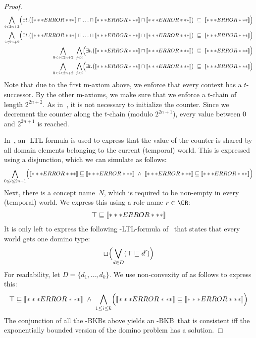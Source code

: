 \begin{proof}
  \begin{align*}
    \bigwedge_{i<2n+2} \Bigl( \exists t.\bigl(\oax{Z_{0}(a)} \sqcap\ldots\sqcap \oax{Z_{i-1}(a)} \sqcap \oax{Z_{i}(a)}\bigr)
    & \ \sqsubseteq\ \oax{(\lnot Z_{i})(a)}\Bigr)\\ 
    \bigwedge_{i<2n+2}\Bigl( \exists t.\bigl(\oax{Z_{0}(a)}\sqcap\ldots\sqcap \oax{Z_{i-1}(a)} \sqcap \oax{(\lnot Z_{i})(a)}\bigr)
    & \ \sqsubseteq\ \oax{Z_{i}(a)}\Bigr)\\
    \bigwedge_{0<i<2n+2}\ \bigwedge_{j<i}\Bigl(\exists t.\bigl(\oax{(\lnot Z_{j})(a)}\sqcap\oax{Z_{i}(a)}\bigr)
    & \ \sqsubseteq\ \oax{Z_{i}(a)}\Bigr)\\
    \bigwedge_{0<i<2n+2}\ \bigwedge_{j<i}\Bigl(\exists t.\bigl(\oax{(\lnot Z_{j})(a)}\sqcap\oax{(\lnot Z_{i})(a)}\bigr)
    & \ \sqsubseteq\ \oax{(\lnot Z_{i})(a)}\Bigr)
  \end{align*}
  Note that due to the first m-axiom above, we enforce that every context has a $t$-successor.  By
  the other m-axioms, we make sure that we enforce a $t$-chain of length $2^{2n+2}$.
  As in~\cite{BaGL-KR08,BaGL-ToCL12}, it is not necessary to initialize the counter.  Since we
  decrement the counter along the $t$-chain (modulo $2^{2n+1}$), every value between $0$ and
  $2^{2n+1}$ is reached.

  In~\cite{BaGL-KR08,BaGL-ToCL12}, an \ALC-LTL-formula is used to express that the value of the
  counter is shared by all domain elements belonging to the current (temporal) world.  This is
  expressed using a disjunction, which we can simulate as follows:
  \begin{gather*}
    \bigwedge_{0\le i\le 2n+1} \Bigl(\oax{Z_i(a)}\sqsubseteq\oax{\top\sqsubseteq Z_i}\ \land\
    \oax{(\lnot Z_i)(a)}\sqsubseteq\oax{Z_i\sqsubseteq\bot}\Bigr)
  \end{gather*}
  Next, there is a concept name~$N$, which is required to be non-empty in every (temporal) world.  We
  express this using a role name $r\in\OR$:
  \begin{gather*}
    \top\sqsubseteq\oax{(\exists r.N)(a)}
  \end{gather*}
  It is only left to express the following \ALC-LTL-formula of~\cite{BaGL-KR08,BaGL-ToCL12} that
  states that every world gets one domino type:
  \begin{gather*}
    \Box\Bigl(\bigvee_{d\in D} (\top\sqsubseteq d')\Bigr)
  \end{gather*}
  For readability, let $D=\{d_1,\dots,d_k\}$.  We use non-convexity of \ALC as follows to express
  this:
  \begin{gather*}
    \top\sqsubseteq\oax{(d_1'\sqcup\dots\sqcup d_k')(a)}\ \land\ \bigwedge_{1\le i\le k}
    \Bigl(\oax{d_i'(a)}\sqsubseteq\oax{\top\sqsubseteq d_i'}\Bigr)
  \end{gather*}
  The conjunction of all the \ELALC-BKBs above yields an \ELALC-BKB~\B that is consistent iff the
  exponentially bounded version of the domino problem has a solution.
\end{proof}

